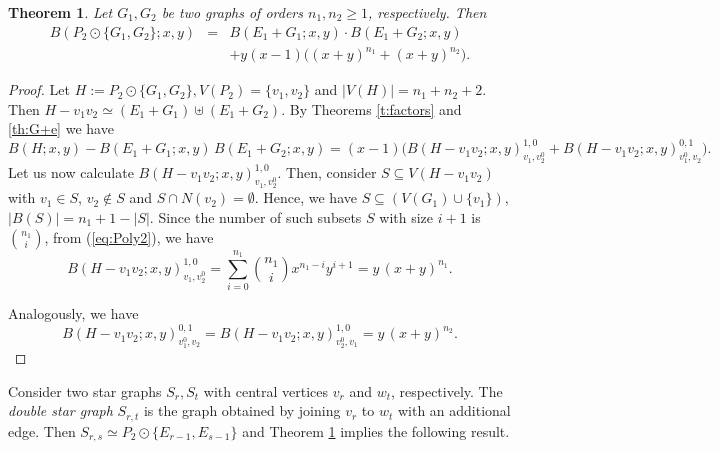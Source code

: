 \documentclass[review]{elsarticle}
\newtheorem{theorem}{Theorem}[section]
\begin{document}
\begin{theorem}\label{t:DobleJoin}
 Let $G_1,G_2$ be two graphs of orders $n_1,n_2\ge 1$, respectively. Then
  \begin{eqnarray}%
  \nonumber
  B(P_2\odot\{G_1,G_2\}; x,y) &=& B(E_1+G_1; x,y)\cdot B(E_1+G_2; x,y)\\
  &&+y(x-1)\Big( (x+y)^{n_{1}}+(x+y)^{n_{2}} \Big).
  \end{eqnarray}
\end{theorem}


\begin{proof}
Let $H:=P_2\odot\{G_1,G_2\}, V(P_2)=\{v_1,v_2\}$ and $|V(H)|=n_1+n_2+2$. Then $H-v_1v_2\simeq (E_1+G_1)\uplus(E_1+G_2)$. By Theorems \ref{t:factors} and \ref{th:G+e} we have
\[
B(H; x,y) - B(E_1+G_1; x,y)\, B(E_1+G_2; x,y) = (x-1)\big( B(H-v_{1}v_{2};x,y)_{v_{1},v_{2}^{0}}^{1,0}+B(H-v_{1}v_{2};x,y)_{v_{1}^{0},v_{2}}^{0,1}\big).
\]
Let us now calculate $B(H-v_{1}v_{2};x,y)_{v_{1},v_{2}^{0}}^{1,0}$. Then, consider $S \subseteq V(H-v_{1}v_{2})$ with $v_{1} \in S$, $v_{2} \notin S$ and $S\cap N(v_{2}) = \emptyset$. Hence, we have $S \subseteq (V(G_{1})\cup\{v_{1}\})$, $|B(S)| = n_{1}+1-|S|$.  Since the number of such
subsets $S$ with size $i+1$ is ${n_1 \choose i}$, from (\ref{eq:Poly2}), we have
\begin{equation}
\nonumber
B(H-v_1v_2;x,y)_{v_1,v^{0}_2}^{1,0}= \sum_{i=0}^{n_{1}}\binom{n_{1}}{i}x^{n_{1}-i}y^{i+1} = y\,(x+y)^{n_{1}}.
\end{equation}

Analogously, we have
\begin{equation}
\nonumber
B(H-v_1v_2;x,y)_{v^{0}_1,v_2}^{0,1} = B(H-v_{1}v_{2};x,y)_{v_{2}^{0},v_{1}}^{1,0} = y\,(x+y)^{n_{2}}.
\end{equation}
\end{proof}


Consider two star graphs $S_{r},S_{t}$ with central vertices $v_r$ and $w_t$, respectively.
  The {\em double star graph} $S_{r,t}$ is the graph obtained by joining $v_r$ to $w_t$ with an additional edge.
 Then $S_{r,s}\simeq P_2\odot\{E_{r-1},E_{s-1}\}$ and Theorem \ref{t:DobleJoin} implies the following result.
\end{document}
